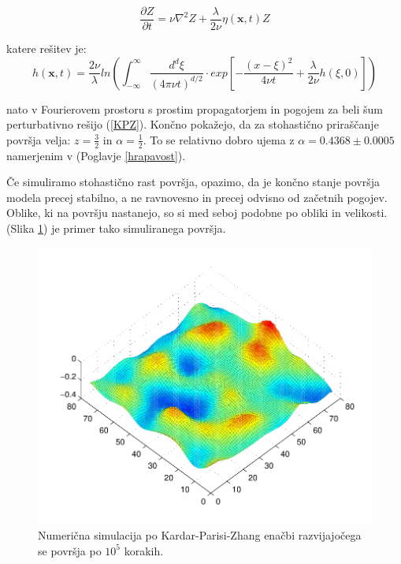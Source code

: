 \documentclass[a4paper, twoside, 12pt]{book}
\begin{document}
    \begin{equation}
      \frac{\partial Z}{\partial t} = \nu \nabla^2 Z + \frac{\lambda}{2 \nu} \eta(\mathbf{x},t) Z
    \end{equation}

    katere rešitev je:
    \begin{equation}
      h(\mathbf{x},t) = \frac{2 \nu}{\lambda} ln \left( \int_{-\infty}^{\infty} \frac{d^d \xi}{(4 \pi \nu t)^{d/2}} \cdot exp \left[-\frac{(x-\xi)^2}{4 \nu t} + \frac{\lambda}{2 \nu}h(\xi,0) \right] \right)
    \end{equation}

    \cite{kardar1986dynamic} nato v Fourierovem prostoru s prostim propagatorjem in pogojem za beli šum perturbativno rešijo (\ref{KPZ}). Končno pokažejo, da za stohastično priraščanje površja velja: $z = \frac{3}{2}$ in $\alpha=\frac{1}{2}$. To se relativno dobro ujema z $\alpha=0.4368 \pm 0.0005$ namerjenim v (Poglavje \ref{hrapavost}).


    Če simuliramo stohastično rast površja, opazimo, da je končno stanje površja modela precej stabilno, a ne ravnovesno in precej odvisno od začetnih pogojev. Oblike, ki na površju nastanejo, so si med seboj podobne po obliki in velikosti. (Slika \ref{fig:KPZ-numericno}) je primer tako simuliranega površja.

    \begin{figure}[h]
      \begin{center}
        \includegraphics[width=13cm]{slike/KPZ-numericno}
      \end{center}
      \caption{Numerična simulacija po Kardar-Parisi-Zhang enačbi razvijajočega se površja po $10^5$ korakih.}
      \label{fig:KPZ-numericno}
    \end{figure}
\end{document}
